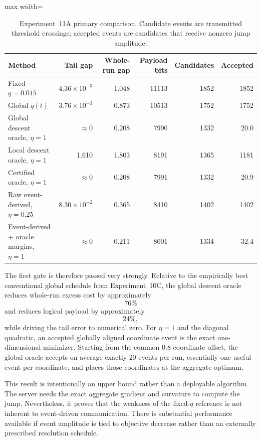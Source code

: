 \begin{table}[ht]
  \centering
  \caption{Experiment~11A primary comparison. Candidate events are transmitted threshold crossings; accepted events are candidates that receive nonzero jump amplitude.}
  \label{tab:exp11a-main}
  \begin{adjustbox}{max width=\textwidth}
\begin{tabular}{lrrrrr}
    \toprule
    Method & Tail gap & Whole-run gap & Payload bits & Candidates & Accepted \\
    \midrule
    Fixed $q=0.015$ & $4.36\!\times\!10^{-3}$ & 1.048 & 11113 & 1852 & 1852 \\
    Global $q(t)$ & $3.76\!\times\!10^{-3}$ & 0.873 & 10513 & 1752 & 1752 \\
    Global descent oracle, $\eta=1$ & $\approx0$ & 0.208 & 7990 & 1332 & 20.0 \\
    Local descent oracle, $\eta=1$ & 1.610 & 1.803 & 8191 & 1365 & 1181 \\
    Certified oracle, $\eta=1$ & $\approx0$ & 0.208 & 7991 & 1332 & 20.9 \\
    Raw event-derived, $\eta=0.25$ & $8.30\!\times\!10^{-2}$ & 0.365 & 8410 & 1402 & 1402 \\
    Event-derived + oracle margins, $\eta=1$ & $\approx0$ & 0.211 & 8001 & 1334 & 32.4 \\
    \bottomrule
  \end{tabular}
\end{adjustbox}
\end{table}

The first gate is therefore passed very strongly. Relative to the empirically best conventional global schedule from Experiment~10C, the global descent oracle reduces whole-run excess cost by approximately
\begin{equation}
  \boxed{76\%}
\end{equation}
and reduces logical payload by approximately
\begin{equation}
  \boxed{24\%},
\end{equation}
while driving the tail error to numerical zero. For $\eta=1$ and the diagonal quadratic, an accepted globally aligned coordinate event is the exact one-dimensional minimizer. Starting from the common $0.8$ coordinate offset, the global oracle accepts on average exactly $20$ events per run, essentially one useful event per coordinate, and places those coordinates at the aggregate optimum.

This result is intentionally an upper bound rather than a deployable algorithm. The server needs the exact aggregate gradient and curvature to compute the jump. Nevertheless, it proves that the weakness of the fixed-$q$ reference is not inherent to event-driven communication. There is substantial performance available if event amplitude is tied to objective decrease rather than an externally prescribed resolution schedule.

